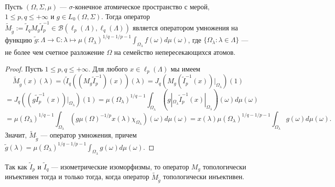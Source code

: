 \begin{proposition}\label{EquivMultOp} Пусть $(\Omega,\Sigma,\mu)$ --- $\sigma$-конечное атомическое пространство с мерой, $1\leq p,q\leq +\infty$ и $g\in L_0(\Omega,\Sigma)$. Тогда оператор $\widetilde{M}_{\widetilde{g}}:=\widetilde{I}_q M_g\widetilde{I}_p^{-1}\in\mathcal{B}(\ell_p(\Lambda),\ell_q(\Lambda))$ является оператором умножения на функцию $\widetilde{g}:\Lambda\to\mathbb{C}:\lambda\mapsto \mu(\Omega_\lambda)^{1/q-1/p-1}\int_{\Omega_\lambda}f(\omega)d\mu(\omega)$, где $\{\Omega_\lambda:\lambda\in\Lambda\}$ --- не более чем счетное разложение $\Omega$ на семейство непересекающихся атомов.
\end{proposition}
\begin{proof} Пусть $1\leq p,q\leq +\infty$. Для любого $x\in\ell_p(\Lambda)$ мы имеем
$$
\widetilde{M}_{\widetilde{g}}(x)(\lambda)
=(\widetilde{I}_q((M_g\widetilde{I}_p^{-1})(x))(\lambda)
=J_q(M_g(\widetilde{I}_p^{-1}(x))|_{\Omega_\lambda})(1)
$$
$$
=J_q((g \widetilde{I}_p^{-1}(x))|_{\Omega_\lambda})(1)
=\mu(\Omega_\lambda)^{1/q-1}\int_{\Omega_\lambda}(g|_{\Omega_\lambda} \widetilde{I}_p^{-1}(x)|_{\Omega_\lambda})(\omega)d\mu(\omega)
$$
$$
=\mu(\Omega_\lambda)^{1/q-1}\int_{\Omega_\lambda}(g \mu(\Omega)^{-1/p}x(\lambda)\chi_{\Omega_{\lambda}})(\omega)d\mu(\omega)
=x(\lambda)\mu(\Omega_\lambda)^{1/q-1/p-1}\int_{\Omega_\lambda} g(\omega)d\mu(\omega).
$$
Значит, $\widetilde{M}_{\widetilde{g}}$ --- оператор умножения, причем $\widetilde{g}(\lambda)=\mu(\Omega_\lambda)^{1/q-1/p-1}\int_{\Omega_\lambda} g(\omega)d\mu(\omega)$.
\end{proof}

Так как $\widetilde{I}_p$ и $\widetilde{I}_q$ --- изометрические изоморфизмы, то оператор $M_g$ топологически инъективен тогда и только тогда, когда оператор $\widetilde{M}_{\widetilde{g}}$ топологически инъективен. 

